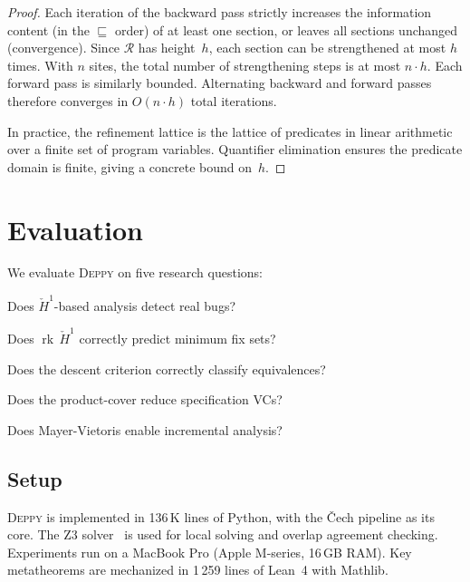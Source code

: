 \documentclass[acmsmall,screen,review,anonymous]{acmart}
\theoremstyle{remark}
\newcommand{\Hc}[1]{\check{H}^{#1}}
\newcommand{\rk}{\operatorname{rk}}
\begin{document}
\begin{proof}
Each iteration of the backward pass strictly increases the information
content (in the $\sqsubseteq$ order) of at least one section, or
leaves all sections unchanged (convergence).  Since $\mathcal{R}$ has
height~$h$, each section can be strengthened at most $h$ times.  With
$n$ sites, the total number of strengthening steps is at most $n \cdot h$.
Each forward pass is similarly bounded.  Alternating backward and
forward passes therefore converges in $O(n \cdot h)$ total iterations.

In practice, the refinement lattice is the lattice of predicates in
linear arithmetic over a finite set of program variables.  Quantifier
elimination ensures the predicate domain is finite, giving a
concrete bound on~$h$.
\end{proof}

\section{Evaluation}\label{sec:evaluation}

We evaluate \textsc{Deppy} on five research questions:
\begin{description}[nosep]
  \item[RQ1] Does $\Hc{1}$-based analysis detect real bugs?
  \item[RQ2] Does $\rk\,\Hc{1}$ correctly predict minimum fix sets?
  \item[RQ3] Does the descent criterion correctly classify equivalences?
  \item[RQ4] Does the product-cover reduce specification VCs?
  \item[RQ5] Does Mayer-Vietoris enable incremental analysis?
\end{description}

\subsection{Setup}

\textsc{Deppy} is implemented in 136\,K lines of Python, with the
\v{C}ech pipeline as its core.  The Z3 solver~\cite{deMouraBjorner08}
is used for local solving and overlap agreement checking.  Experiments
run on a MacBook Pro (Apple M-series, 16\,GB RAM).
Key metatheorems are mechanized in 1\,259 lines of Lean~4 with Mathlib.
\end{document}
